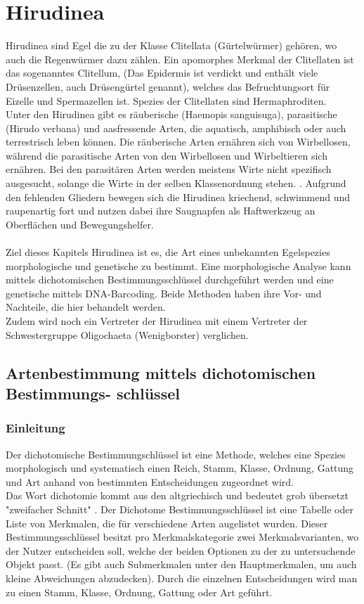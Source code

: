 \documentclass[oneside,10pt,a4paper]{report}
\begin{document}
	\chapter{Hirudinea}	
	Hirudinea sind Egel die zu der Klasse Clitellata (Gürtelwürmer) gehören, wo auch die Regenwürmer dazu zählen. Ein apomorphes Merkmal der Clitellaten ist das sogenanntes Clitellum, (Das Epidermis ist verdickt und enthält viele Drüsenzellen, auch Drüsengürtel genannt), welches das Befruchtungsort für Eizelle und Spermazellen ist\cite{Kühkental}. Spezies der Clitellaten sind Hermaphroditen. \\
	Unter den Hirudinea gibt es räuberische (Haemopis sanguisuga), parasitische (Hirudo verbana) und aasfressende Arten, die aquatisch, amphibisch oder auch terrestrisch leben können.
	Die räuberische Arten ernähren sich von Wirbellosen, während die parasitische Arten von den Wirbellosen und Wirbeltieren sich ernähren. Bei den parasitären Arten werden meistens Wirte nicht spezifisch ausgesucht, solange die Wirte in der selben Klassenordnung stehen. \cite{Kühkental}.
	Aufgrund den fehlenden Gliedern bewegen sich die Hirudinea kriechend, schwimmend und raupenartig fort und nutzen dabei ihre Saugnapfen als Haftwerkzeug an Oberflächen und Bewegungshelfer.\\
	\\
	Ziel dieses Kapitels Hirudinea ist es, die Art eines unbekannten Egelspezies morphologische und genetische zu bestimmt. Eine morphologische Analyse kann mittels dichotomischen Bestimmungsschlüssel durchgeführt werden und eine genetische mittels DNA-Barcoding. Beide Methoden haben ihre Vor- und Nachteile, die hier behandelt werden.\\
	Zudem wird noch ein Vertreter der Hirudinea mit einem Vertreter der Schwestergruppe Oligochaeta (Wenigborster) verglichen.
	
	
		\section{Artenbestimmung mittels dichotomischen Bestimmungs- schlüssel}\label{Abschnitt: DichoBestim}
			\subsection{Einleitung}
				Der dichotomische Bestimmungschlüssel ist eine Methode, welches eine Spezies morphologisch und systematisch einen Reich, Stamm, Klasse, Ordnung, Gattung und Art anhand von bestimmten Entscheidungen zugeordnet wird.\\
				Das Wort dichotomie kommt aus den altgriechisch und bedeutet grob übersetzt "zweifacher Schnitt" \cite{wiki_dichotom}.
				Der Dichotome Bestimmungsschlüssel ist eine Tabelle oder Liste von Merkmalen, die für verschiedene Arten augelistet wurden. Dieser Bestimmungsschlüssel besitzt pro Merkmalskategorie zwei Merkmalsvarianten, wo der Nutzer entscheiden soll, welche der beiden Optionen zu der zu untersuchende Objekt passt. (Es gibt auch Submerkmalen unter den Hauptmerkmalen, um auch kleine Abweichungen abzudecken)\cite{dichotomer_schlüssel}. Durch die einzelnen Entscheidungen wird man zu einen Stamm, Klasse, Ordnung, Gattung oder Art geführt.\\
\end{document}
